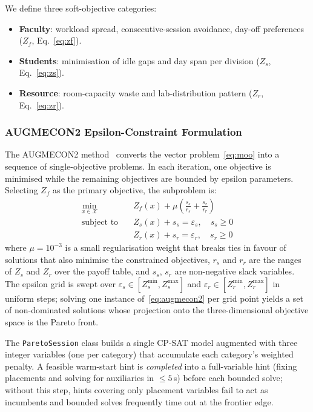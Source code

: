 \documentclass[conference]{IEEEtran}
\begin{document}
We define three soft-objective categories:
\begin{itemize}
  \item \textbf{Faculty}: workload spread, consecutive-session avoidance,
        day-off preferences ($Z_f$, Eq.~\eqref{eq:zf}).
  \item \textbf{Students}: minimisation of idle gaps and day span per
        division ($Z_s$, Eq.~\eqref{eq:zs}).
  \item \textbf{Resource}: room-capacity waste and lab-distribution pattern
        ($Z_r$, Eq.~\eqref{eq:zr}).
\end{itemize}

\subsubsection{AUGMECON2 Epsilon-Constraint Formulation}

The AUGMECON2 method~\cite{Mavrotas2009} converts the vector
problem~\eqref{eq:moo} into a sequence of single-objective problems. In each
iteration, one objective is minimised while the remaining objectives are
bounded by epsilon parameters. Selecting $Z_f$ as the primary objective, the
subproblem is:
\begin{equation}
\begin{aligned}
  \min_{x \in \mathcal{X}} \quad & Z_f(x) + \mu\!\left(\frac{s_s}{r_s} + \frac{s_r}{r_r}\right) \\
  \text{subject to} \quad
  & Z_s(x) + s_s = \varepsilon_s, \quad s_s \ge 0 \\
  & Z_r(x) + s_r = \varepsilon_r, \quad s_r \ge 0
\end{aligned}
\label{eq:augmecon2}
\end{equation}
where $\mu = 10^{-3}$ is a small regularisation weight that breaks ties in
favour of solutions that also minimise the constrained objectives, $r_s$ and
$r_r$ are the ranges of $Z_s$ and $Z_r$ over the payoff table, and $s_s$,
$s_r$ are non-negative slack variables. The epsilon grid is swept over
$\varepsilon_s \in [Z_s^{\min}, Z_s^{\max}]$ and
$\varepsilon_r \in [Z_r^{\min}, Z_r^{\max}]$ in uniform steps; solving
one instance of~\eqref{eq:augmecon2} per grid point yields a set of
non-dominated solutions whose projection onto the three-dimensional objective
space is the Pareto front.

The \texttt{ParetoSession} class builds a single CP-SAT model augmented with
three integer variables (one per category) that accumulate each category's
weighted penalty. A feasible warm-start hint is \emph{completed} into a
full-variable hint (fixing placements and solving for auxiliaries in
$\le 5$\,s) before each bounded solve; without this step, hints covering only
placement variables fail to act as incumbents and bounded solves frequently
time out at the frontier edge.
\end{document}
